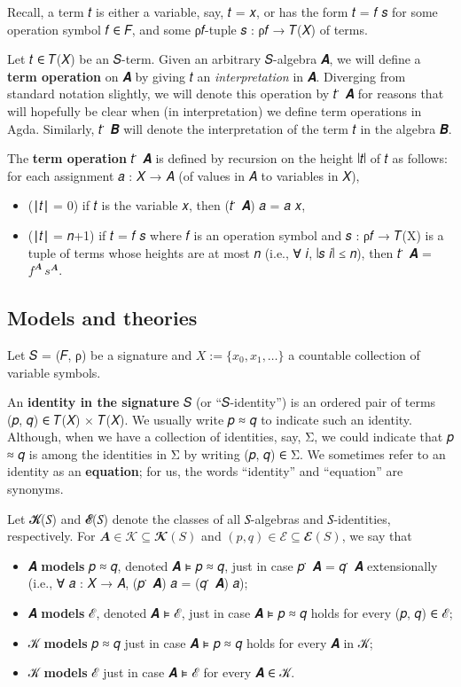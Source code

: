 \documentclass[sigplan,screen]{acmart}
\begin{document}

Recall, a term 𝑡 is either a variable, say, 𝑡 = 𝑥, or has the form 𝑡 = 𝑓 𝑠 for some operation symbol 𝑓 ∈ 𝐹, and some ρ𝑓-tuple 𝑠 : ρ𝑓 → 𝑇(𝑋) of terms.

Let 𝑡 ∈ 𝑇(𝑋) be an 𝑆-term. Given an arbitrary 𝑆-algebra 𝑨, we will define a \textbf{term operation} on 𝑨 by giving 𝑡 an \emph{interpretation} in 𝑨. Diverging from standard notation slightly, we will denote this operation by 𝑡 ̇ 𝑨 for reasons that will hopefully be clear when (in interpretation) we define term operations in Agda. Similarly, 𝑡 ̇ 𝑩 will denote the interpretation of the term 𝑡 in the algebra 𝑩.

The \textbf{term operation} 𝑡 ̇ 𝑨 is defined by recursion on the height ∣𝑡∣ of 𝑡 as follows: for each assignment 𝑎 : 𝑋 → 𝐴 (of values in 𝐴 to variables in 𝑋),
\begin{itemize}
\item (∣𝑡∣ = 0) if 𝑡 is the variable 𝑥, then (𝑡 ̇ 𝑨) 𝑎 = 𝑎 𝑥,
\item (∣𝑡∣ = 𝑛+1) if 𝑡 = 𝑓 𝑠 where 𝑓 is an operation symbol and 𝑠 : ρ𝑓 → 𝑇(X) is a tuple of terms whose heights are at most 𝑛 (i.e., ∀ 𝑖, ∣𝑠 𝑖∣ ≤ 𝑛), then 𝑡 ̇ 𝑨 = \(f^{𝑨} \, s^{𝑨}\).
\end{itemize}

\subsection{Models and theories}\label{models-and-theories}
Let 𝑆 = (𝐹, ρ) be a signature and \(X := \{x_0, x_1, \dots\}\) a countable collection of variable symbols.

An \textbf{identity in the signature} 𝑆 (or ``𝑆-identity'') is an ordered pair of terms (𝑝, 𝑞) ∈ 𝑇(𝑋) × 𝑇(𝑋). We usually write 𝑝 ≈ 𝑞 to indicate such an identity. Although, when we have a collection of identities, say, Σ, we could indicate that 𝑝 ≈ 𝑞 is among the identities in Σ by writing (𝑝, 𝑞) ∈ Σ. We sometimes refer to an identity as an \textbf{equation}; for us, the words ``identity'' and ``equation'' are synonyms.

Let 𝓚(𝑆) and 𝓔(𝑆) denote the classes of all 𝑆-algebras and 𝑆-identities, respectively. For \(𝑨 ∈ 𝒦 ⊆ 𝓚(𝑆)\) and \((𝑝, 𝑞) ∈ ℰ ⊆ 𝓔(𝑆)\), we say that
\begin{itemize}
\item 𝑨 \textbf{models} 𝑝 ≈ 𝑞, denoted 𝑨 ⊧ 𝑝 ≈ 𝑞, just in case 𝑝 ̇ 𝑨 = 𝑞 ̇ 𝑨 extensionally (i.e., ∀ 𝑎 : 𝑋 → 𝐴, (𝑝 ̇ 𝑨) 𝑎 = (𝑞 ̇ 𝑨) 𝑎);
\item 𝑨 \textbf{models} ℰ, denoted 𝑨 ⊧ ℰ, just in case 𝑨 ⊧ 𝑝 ≈ 𝑞 holds for every (𝑝, 𝑞) ∈ ℰ;
\item 𝒦 \textbf{models} 𝑝 ≈ 𝑞 just in case 𝑨 ⊧ 𝑝 ≈ 𝑞 holds for every 𝑨 in 𝒦;
\item 𝒦 \textbf{models} ℰ just in case 𝑨 ⊧ ℰ for every 𝑨 ∈ 𝒦.
\end{itemize}
\end{document}
